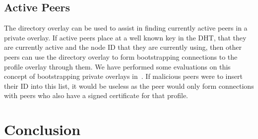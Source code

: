 \documentclass[letterpaper,twocolumn,10pt]{article}
\begin{document}
\subsection{Active Peers}
The directory overlay can be used to assist in finding currently active peers in
a private overlay.  If active peers place at a well known key in the DHT, that
they are currently active and the node ID that they are currently using, then
other peers can use the directory overlay to form bootstrapping connections to the
profile overlay through them.  We have performed some evaluations on this concept
of bootstrapping private overlays in~\cite{icdcs10}.  If malicious peers were to
insert their ID into this list, it would be useless as the peer would only form
connections with peers who also have a signed certificate for that profile.

\section{Conclusion}
\label{conclusion}


\small{

\suppressfloats
}
\end{document}
